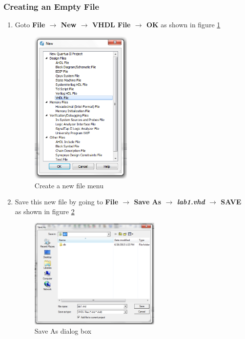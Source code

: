 \subsubsection{Creating an Empty File}
\begin{enumerate}

	\item Goto {\bf File $\rightarrow$ New $\rightarrow$ VHDL File $\rightarrow$ OK } as shown in figure \ref{fig:newfile}

	\begin{figure}[H]
		\centering
		\includegraphics[width=50mm]{Lab1/figures/newfile.png}
		\caption{Create a new file menu}
		\label{fig:newfile}
	\end{figure}

	\item Save this new file by going to {\bf File $\rightarrow$ Save As $\rightarrow$ \emph{lab1.vhd} $\rightarrow$ SAVE} as shown in figure \ref{fig:saveas}

	\begin{figure}[H]
		\centering
		\includegraphics[width=65mm]{Lab1/figures/saveas.png}
		\caption{Save As dialog box}
		\label{fig:saveas}
	\end{figure}

\end{enumerate}

